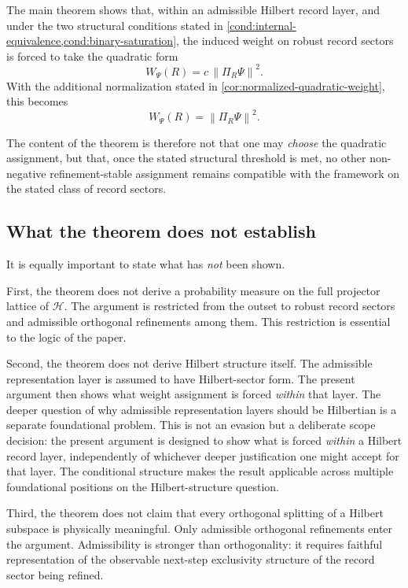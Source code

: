 \documentclass[11pt]{article}
\theoremstyle{remark}
\numberwithin{equation}{section}
\newcommand{\HH}{\mathcal{H}}
\newcommand{\Wpsi}[1]{W_{\Psi}\!\left(#1\right)}
\newcommand{\Proj}[1]{\Pi_{#1}}
\newcommand{\norm}[1]{\left\lVert #1 \right\rVert}
\begin{document}
The main theorem shows that, within an admissible Hilbert record layer, and under the two structural conditions stated in \cref{cond:internal-equivalence,cond:binary-saturation}, the induced weight on robust record sectors is forced to take the quadratic form
\[
\Wpsi{R} = c\,\norm{\Proj{R}\Psi}^2.
\]
With the additional normalization stated in \cref{cor:normalized-quadratic-weight}, this becomes
\[
\Wpsi{R} = \norm{\Proj{R}\Psi}^2.
\]

The content of the theorem is therefore not that one may \emph{choose} the quadratic assignment, but that, once the stated structural threshold is met, no other non-negative refinement-stable assignment remains compatible with the framework on the stated class of record sectors.

\subsection{What the theorem does not establish}

It is equally important to state what has \emph{not} been shown.

First, the theorem does not derive a probability measure on the full projector lattice of \(\HH\). The argument is restricted from the outset to robust record sectors and admissible orthogonal refinements among them. This restriction is essential to the logic of the paper.

Second, the theorem does not derive Hilbert structure itself. The admissible representation layer is assumed to have Hilbert-sector form. The present argument then shows what weight assignment is forced \emph{within} that layer. The deeper question of why admissible representation layers should be Hilbertian is a separate foundational problem. This is not an evasion but a deliberate scope decision: the present argument is designed to show what is forced \emph{within} a Hilbert record layer, independently of whichever deeper justification one might accept for that layer. The conditional structure makes the result applicable across multiple foundational positions on the Hilbert-structure question.

Third, the theorem does not claim that every orthogonal splitting of a Hilbert subspace is physically meaningful. Only admissible orthogonal refinements enter the argument. Admissibility is stronger than orthogonality: it requires faithful representation of the observable next-step exclusivity structure of the record sector being refined.
\end{document}
